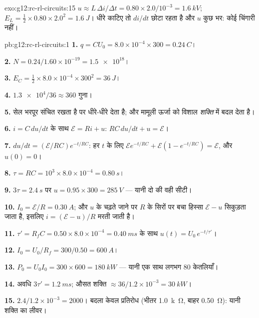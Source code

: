 \begin{solution}{exo:g12:rc-rl-circuits:15}
$u \approx L\,\Delta i/\Delta t = 0.80 \times 2.0/10^{-3} =
\qty{1.6}{kV}$; $E_L = \tfrac12 \times 0.80 \times 2.0^2 =
\qty{1.6}{J}$। धीरे काटिए तो $di/dt$ छोटा रहता है और $u$ कुछ 
भर: कोई चिंगारी नहीं।
\end{solution}

\begin{solution}{pb:g12:rc-rl-circuits:1}
\textbf{1.} $q = CU_0 = 8.0\times10^{-4} \times 300 = \qty{0.24}{C}$।

\textbf{2.} $N = 0.24/1.60\times10^{-19} = \num{1.5e18}$।

\textbf{3.} $E_C = \tfrac12 \times 8.0\times10^{-4} \times 300^2 =
\qty{36}{J}$।

\textbf{4.} $\num{1.3e4}/36 \approx 360$ गुना।

\textbf{5.} सेल भरपूर संचित रखता है पर धीरे-धीरे देता है; और
 मामूली ऊर्जा को विशाल \emph{शक्ति} में बदल
देता है।

\textbf{6.} $i = C\,du/dt$ के साथ $\mathcal{E} = Ri + u$: $RC\,du/dt + u = \mathcal{E}$।

\textbf{7.} $du/dt = (\mathcal{E}/RC)e^{-t/RC}$: हर $t$ के लिए $\mathcal{E}e^{-t/RC} + \mathcal{E}(1 - e^{-t/RC}) = \mathcal{E}$, और $u(0) = 0$।

\textbf{8.} $\tau = RC = 10^3 \times 8.0\times10^{-4} = \qty{0.80}{s}$।

\textbf{9.} $3\tau = \qty{2.4}{s}$ पर $u = 0.95 \times 300 =
\qty{285}{V}$ --- यानी दो  की वही सीटी।

\textbf{10.} $I_0 = \mathcal{E}/R = \qty{0.30}{A}$; और $u$ के चढ़ते जाने पर $R$ के सिरों पर बचा
हिस्सा $\mathcal{E} - u$ सिकुड़ता जाता है, इसलिए $i = (\mathcal{E}-u)/R$ मरती जाती है।

\textbf{11.} $\tau' = R_f C =
0.50 \times 8.0\times10^{-4} = \qty{0.40}{ms}$ के साथ $u(t) = U_0\,e^{-t/\tau'}$।

\textbf{12.} $I_0 = U_0/R_f = 300/0.50 = \qty{600}{A}$।

\textbf{13.} $P_0 = U_0 I_0 = 300 \times 600 = \qty{180}{kW}$ --- यानी एक साथ लगभग $80$ केतलियाँ।

\textbf{14.} अवधि $3\tau' = \qty{1.2}{ms}$; औसत शक्ति $\approx 36/1.2\times10^{-3} = \qty{30}{kW}$।

\textbf{15.} $2.4/1.2\times10^{-3} = 2000$। बदला केवल प्रतिरोध (भीतर \qty{1.0}{k\ohm}, बाहर \qty{0.50}{\ohm}):
यानी शक्ति का लीवर।


\end{solution}
